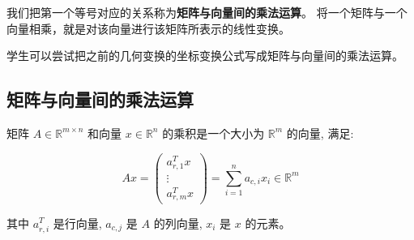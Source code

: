 我们把第一个等号对应的关系称为\textcolor{third}{\bf 矩阵与向量间的乘法运算}。
将一个矩阵与一个向量相乘，就是对该向量进行该矩阵所表示的线性变换。

\begin{note}
  学生可以尝试把之前的几何变换的坐标变换公式写成矩阵与向量间的乘法运算。
\end{note}

\subsection{矩阵与向量间的乘法运算}

\begin{definition}[矩阵与向量间的乘法运算] \label{def:mat-vec-multi}

矩阵 $A \in \mathbb{R}^{m \times n}$ 和向量 $x \in \mathbb{R}^n$ 的乘积是一个大小为 $\mathbb{R}^m$ 的向量, 满足:

$$
A x=\left(\begin{array}{c}
a_{r, 1}^T x \\
\vdots \\
a_{r, m}^T x
\end{array}\right)=\sum_{i=1}^n a_{c, i} x_i \in \mathbb{R}^m
$$

其中 $a_{r, i}^T$ 是行向量, $a_{c, j}$ 是 $A$ 的列向量, $x_i$ 是 $x$ 的元素。
\end{definition}

